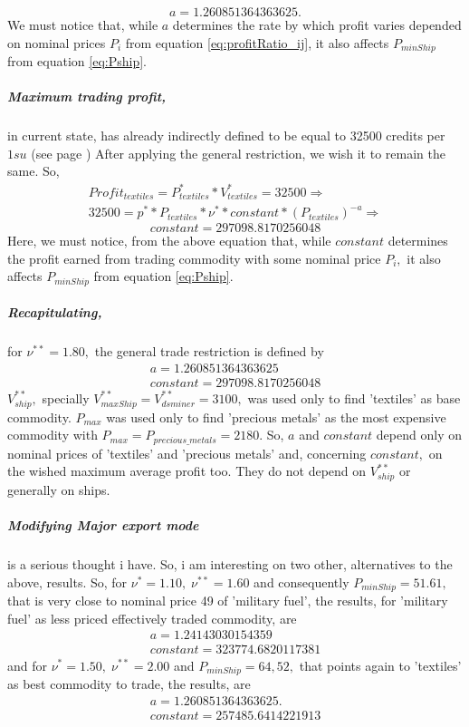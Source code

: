 \documentclass[]{article}
\begin{document}
	\[a=1.260851364363625.\]
We must notice that, while $a$ determines the rate by which profit varies depended on nominal prices $P_{i}$ from equation \eqref{eq:profitRatio_ij}, it also affects $P_{minShip}$ from equation \eqref{eq:Pship}. 
\subparagraph{Maximum trading profit,}  in current state, has already indirectly defined to be equal to 32500 credits per $1su$ (see page \pageref{maximumCurrentTradingProfit}) After applying the general restriction, we wish it to remain the same. So,
\begin{align*}	Profit_{textiles}=P^{*}_{textiles}*V^{*}_{textiles}=32500 \Rightarrow\\
	32500=p^{*}*P_{textiles}*\nu^{*}*constant*(P_{textiles})^{-a}\Rightarrow	
\end{align*}
\[
	constant=297098.8170256048
\]
Here, we must notice, from the above equation that, while $constant$ determines the profit  earned from trading commodity with some nominal price $P_{i},$ it also affects $P_{minShip}$ from equation \eqref{eq:Pship}.

\subparagraph*{Recapitulating,} for $\nu^{**}=1.80,$ the general trade restriction is defined by
\begin{equation}\label{results_a_for_v_1.80}
	\begin{split}
	a=1.260851364363625\\
	constant=297098.8170256048	
	\end{split}	
\end{equation}
$V^{**}_{ship},$ specially $V^{**}_{maxShip}=V^{**}_{dsminer}=3100,$ was used only to find 'textiles' as base commodity. $P_{max}$ was used only to find 'precious metals' as the most expensive commodity with $P_{max}=P_{precious\_metals}=2180.$ So, $a$ and $constant$ depend only on nominal prices of 'textiles' and 'precious metals' and, concerning $constant,$  on the wished maximum average profit too. They do not depend on $V^{**}_{ship}$ or generally on ships.
\subparagraph{Modifying Major export mode} is a serious thought i have. So, i am interesting on two other, alternatives to the above, results. So, for
$\nu^{*}=1.10,\; \nu^{**}=1.60$ and consequently $P_{minShip}=51.61,$ that is very close to nominal price 49 of 'military fuel', the results, for 'military fuel' as less priced effectively traded commodity, are
\begin{equation}\label{results_a_for_v_1.60}
	\begin{split}
		a=1.24143030154359\\ 
		constant=323774.6820117381
	\end{split}
\end{equation} and for
$\nu^{*}=1.50,\; \nu^{**}=2.00$ and $P_{minShip}=64,52,$ that points again to 'textiles' as best commodity to trade, the results, are
\begin{equation}\label{results_a_for_v_2.0}
	\begin{split}
		a=1.260851364363625.\\ 
		constant=257485.6414221913
	\end{split}
\end{equation}
\end{document}
